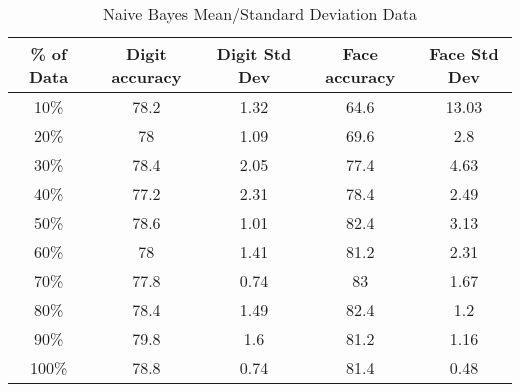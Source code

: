 \documentclass{article}
\begin{document}
\begin{table}[H]
\centering
\caption{Naive Bayes Mean/Standard Deviation Data}
	\begin{tabular}{|*{5}{c|}|}
		\hline
		\% of Data & Digit accuracy & Digit Std Dev & Face accuracy & Face Std Dev \\
		\hline
	    10\%  & 78.2  & 1.32  & 64.6  & 13.03 \\
		20\%  & 78    & 1.09  & 69.6  & 2.8 \\
		30\%  & 78.4  & 2.05  & 77.4  & 4.63 \\
		40\%  & 77.2  & 2.31  & 78.4  & 2.49 \\
		50\%  & 78.6  & 1.01  & 82.4  & 3.13 \\
		60\%  & 78    & 1.41  & 81.2  & 2.31 \\
		70\%  & 77.8  & 0.74  & 83    & 1.67 \\
		80\%  & 78.4  & 1.49  & 82.4  & 1.2 \\
		90\%  & 79.8  & 1.6   & 81.2  & 1.16 \\
		100\% & 78.8  & 0.74  & 81.4  & 0.48 \\
		\hline
	\end{tabular}%
\end{table}%
\end{document}
